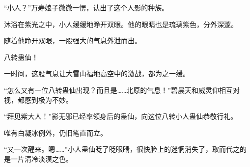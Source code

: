 \begin{this_body}
“小人？”万寿娘子微微一愣，认出了这个人影的种族。

沐浴在紫光之中，小人缓缓地睁开双眼。他的眼睛也是琉璃紫色，分外深邃。

随着他睁开双眼，一股强大的气息外泄而出。

八转蛊仙！

一时间，这股气息让大雪山福地高空中的激战，都为之一缓。

“怎么又有一位八转蛊仙出现？而且是……北原的气息！”碧晨天和威灵仰相互对视，都感到极为不妙。

“拜见紫大人！”影无邪已经率领身后的蛊仙，向这位八转小人蛊仙恭敬行礼。

唯有白凝冰例外，仍旧笔直而立。

“又一次醒来。嗯……”小人蛊仙眨了眨眼睛，很快脸上的迷惘消失了，取而代之的是一片清冷淡漠之色。

\end{this_body}

